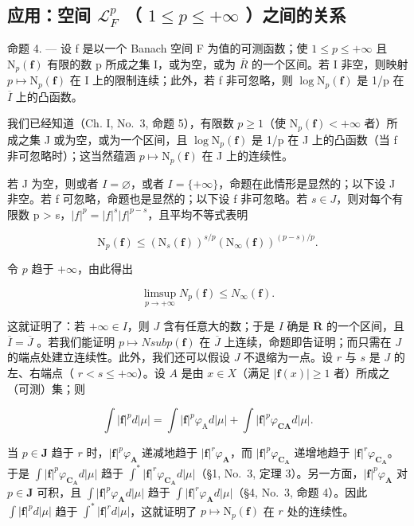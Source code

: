 \subsection{\texorpdfstring{应用：空间 \(\mathcal{L}_{F}^{p}\) （ \(1 \leqslant p \leqslant +\infty\) ）之间的关系}{应用：空间 L sub F to the p （ 1 <= p <= +infinity ）之间的关系}}

命题 4. --- 设 f 是以一个 Banach 空间 F 为值的可测函数；使 \(1 \leqslant p \leqslant +\infty\) 且 \(\mathrm{N}_{p}(\mathbf{f})\) 有限的数 p 所成之集 I，或为空，或为 \(\overline{R}\) 的一个区间。若 I 非空，则映射 \(p \mapsto \mathrm{N}_{p}(\mathbf{f})\) 在 I 上的限制连续；此外，若 f 非可忽略，则 \(\log \mathrm{N}_{p}(\mathbf{f})\) 是 1/p 在 \(\overline{I}\) 上的凸函数。

我们已经知道（Ch. I, No.~3, 命题 5），有限数 \(p \geqslant 1\)（使 \(\mathrm{N}_{p}(\mathbf{f}) < +\infty\) 者）所成之集 J 或为空，或为一个区间，且 \(\log \mathrm{N}_{p}(\mathbf{f})\) 是 1/p 在 J 上的凸函数（当 f 非可忽略时）；这当然蕴涵 \(p \mapsto \mathrm{N}_{p}(\mathbf{f})\) 在 J 上的连续性。

若 J 为空，则或者 \(I = \varnothing\)，或者 \(I = \{+\infty\}\)，命题在此情形是显然的；以下设 J 非空。若 f 可忽略，命题也是显然的；以下设 f 非可忽略。若 \(s \in J\)，则对每个有限数 p \textgreater{} s，\(|f|^{p} = |f|^{s}|f|^{p-s}\)，且平均不等式表明

\[
\mathrm{N} _ {p} (\mathbf {f}) \leqslant \left(\mathrm{N} _ {s} (\mathbf {f})\right) ^ {s / p} \left(\mathrm{N} _ {\infty} (\mathbf {f})\right) ^ {(p - s) / p}.\tag{12}
\]

令 \(p\) 趋于 \(+\infty\)，由此得出

\[
\limsup _ {p \to + \infty} N _ {p} (\mathbf {f}) \leqslant N _ {\infty} (\mathbf {f})  .\tag{13}
\]

这就证明了：若 \(+\infty \in I\)，则 \(J\) 含有任意大的数；于是 \(I\) 确是 \(\overline{\mathbf{R}}\) 的一个区间，且 \(\overline{I} = \overline{J}\) 。若我们能证明 \(p \mapsto N sub p(\mathbf{f})\) 在 \(\overline{J}\) 上连续，命题即告证明；而只需在 \(J\) 的端点处建立连续性。此外，我们还可以假设 \(J\) 不退缩为一点。设 \(r\) 与 \(s\) 是 \(J\) 的左、右端点（ \(r < s \leqslant +\infty\)）。设 \(A\) 是由 \(x \in X\)（满足 \(|\mathbf{f}(x)| \geqslant 1\) 者）所成之（可测）集；则

\[
\int | \mathbf {f} | ^ {p} d | \mu | = \int | \mathbf {f} | ^ {p} \varphi_ {\mathrm{A}} d | \mu | + \int | \mathbf {f} | ^ {p} \varphi_ {\mathbf {C A}} d | \mu |.
\]

当 \(p \in \mathbf{J}\) 趋于 \(r\) 时，\(|\mathbf{f}|^p\varphi_{\mathbf{A}}\) 递减地趋于 \(|\mathbf{f}|^r\varphi_{\mathbf{A}}\)，而 \(|\mathbf{f}|^p\varphi_{\mathbf{C}_{\mathbf{A}}}\) 递增地趋于 \(|\mathbf{f}|^r\varphi_{\mathbf{C}_{\mathbf{A}}}\)。于是 \(\int |\mathbf{f}|^p\varphi_{\mathbf{C}_{\mathbf{A}}}d|\mu|\) 趋于 \(\int^{*}|\mathbf{f}|^{r}\varphi_{\mathbf{C}_{\mathbf{A}}}d|\mu|\)（§1, No.~3, 定理 3）。另一方面，\(|\mathbf{f}|^p\varphi_{\mathbf{A}}\) 对 \(p \in \mathbf{J}\) 可积，且 \(\int |\mathbf{f}|^p\varphi_{\mathbf{A}}d|\mu|\) 趋于 \(\int |\mathbf{f}|^r\varphi_{\mathbf{A}}d|\mu|\)（§4, No.~3, 命题 4）。因此 \(\int |\mathbf{f}|^p d|\mu|\) 趋于 \(\int^{*}|\mathbf{f}|^{r}d|\mu|\)，这就证明了 \(p \mapsto \mathrm{N}_p(\mathbf{f})\) 在 \(r\) 处的连续性。

